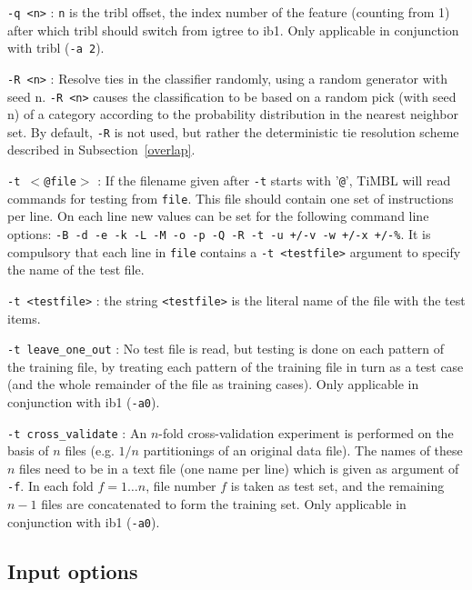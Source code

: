 \documentclass{report}
\begin{document}
\begin{description}
\item {\tt -q <n>} : {\tt n} is the {\sc tribl} offset, the index
number of the feature (counting from 1) after which {\sc tribl} should
switch from {\sc igtree} to {\sc ib1}. Only applicable in conjunction
with {\sc tribl} ({\tt -a 2}).

\item {\tt -R <n>} : Resolve ties in the classifier randomly, using a
random generator with seed n. {\tt -R <n>} causes the classification
to be based on a random pick (with seed n) of a category according to
the probability distribution in the nearest neighbor set. By default,
{\tt -R} is not used, but rather the deterministic tie resolution
scheme described in Subsection~\ref{overlap}.

\item {\tt -t $<$@file$>$} : If the filename given after {\tt -t} starts
with '{\tt @}', TiMBL will read commands for testing from {\tt file}.
This file should contain one set of instructions per line. On each
line new values can be set for the following command line options:
{\tt -B -d -e -k -L -M -o -p -Q -R -t -u +/-v -w +/-x +/-\%}. It is
compulsory that each line in {\tt file} contains a {\tt -t <testfile>}
argument to specify the name of the test file.

\item {\tt -t <testfile>} : the string {\tt <testfile>} is the literal name
of the file with the test items.

\item {\tt -t leave\_one\_out} : No test file is read, but testing is
done on each pattern of the training file, by treating each pattern of
the training file in turn as a test case (and the whole remainder of
the file as training cases). Only applicable in conjunction with {\sc ib1} ({\tt -a0}).

\item {\tt -t cross\_validate} : An $n$-fold cross-validation
experiment is performed on the basis of $n$ files (e.g. $1/n$
partitionings of an original data file). The names of these $n$ files
need to be in a text file (one name per line) which is given as
argument of {\tt -f}. In each fold $f=1 \ldots n$, file number $f$ is
taken as test set, and the remaining $n-1$ files are concatenated to
form the training set. Only applicable in conjunction with {\sc ib1} ({\tt -a0}).

\end{description}

\subsection{Input options}
\end{document}
